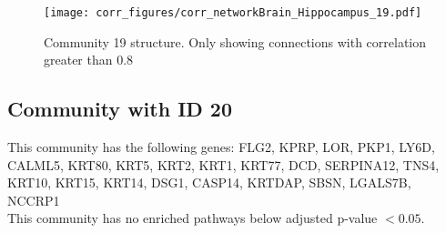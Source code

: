 \begin{figure}[h!]
\centering
\texttt{[image: corr\_figures/corr\_networkBrain\_Hippocampus\_19.pdf]}
\caption{Community 19 structure. Only showing connections with correlation greater than 0.8}
\end{figure}




\subsection*{Community with ID 20}
This community has the following genes: FLG2, KPRP, LOR, PKP1, LY6D, CALML5, KRT80, KRT5, KRT2, KRT1, KRT77, DCD, SERPINA12, TNS4, KRT10, KRT15, KRT14, DSG1, CASP14, KRTDAP, SBSN, LGALS7B, NCCRP1
\\
This community has no enriched pathways below adjusted p-value $< 0.05$.

